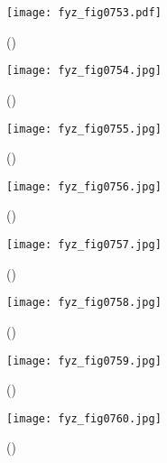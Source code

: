     \begin{figure}[ht!] %
      \centering
      \texttt{[image: fyz\_fig0753.pdf]}
      \caption{
               (\cite[s.~707]{Feynman02})}
      \label{fyz:fig0753}
    \end{figure}



    \begin{figure}[ht!] %
      \centering
      \texttt{[image: fyz\_fig0754.jpg]}
      \caption{
               (\cite[s.~707]{Feynman02})}
      \label{fyz:fig0754}
    \end{figure}

    \begin{figure}[ht!] %
      \centering
      \texttt{[image: fyz\_fig0755.jpg]}
      \caption{
               (\cite[s.~707]{Feynman02})}
      \label{fyz:fig0755}
    \end{figure}

    \begin{figure}[ht!] %
      \centering
      \texttt{[image: fyz\_fig0756.jpg]}
      \caption{
               (\cite[s.~707]{Feynman02})}
      \label{fyz:fig0756}
    \end{figure}

    \begin{figure}[ht!] %
      \centering
      \texttt{[image: fyz\_fig0757.jpg]}
      \caption{
               (\cite[s.~707]{Feynman02})}
      \label{fyz:fig0757}
    \end{figure}

    \begin{figure}[ht!] %
      \centering
      \texttt{[image: fyz\_fig0758.jpg]}
      \caption{
               (\cite[s.~707]{Feynman02})}
      \label{fyz:fig0758}
    \end{figure}

    \begin{figure}[ht!] %
      \centering
      \texttt{[image: fyz\_fig0759.jpg]}
      \caption{
               (\cite[s.~707]{Feynman02})}
      \label{fyz:fig0759}
    \end{figure}
    
    \begin{figure}[ht!] %
      \centering
      \texttt{[image: fyz\_fig0760.jpg]}
      \caption{
               (\cite[s.~707]{Feynman02})}
      \label{fyz:fig0760}
    \end{figure}

